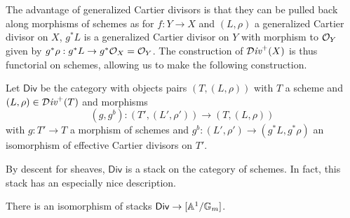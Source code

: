 \\\\
The advantage of generalized Cartier divisors is that they can be pulled back along morphisms of schemes as for $f:Y\to X$ and $(L,\rho)$ a generalized Cartier divisor on $X$, $g^{*}L$ is a generalized Cartier divisor on $Y$ with morphism to $\mathcal{O}_{Y}$ given by $g^{*}\rho:g^{*}L\to g^{*}\mathcal{O}_{X}=\mathcal{O}_{Y}$. The construction of $\operatorname{\mathcal{D}\emph{iv}}^{+}(X)$ is thus functorial on schemes, allowing us to make the following construction. 
\begin{definition}\label{def: the fibered category of generalized cartier Divisors}
    Let $\mathsf{Div}$ be the category with objects pairs $\left(T,(L,\rho)\right)$ with $T$ a scheme and $(L,\rho)\in\operatorname{\mathcal{D}\emph{iv}}^{+}(T)$ and morphisms 
    $$(g,g^{b}):\left(T',(L',\rho')\right)\longrightarrow\left(T,(L,\rho)\right)$$
    with $g:T'\to T$ a morphism of schemes and $g^{b}:(L',\rho')\to(g^{*}L,g^{*}\rho)$ an isomorphism of effective Cartier divisors on $T'$. 
\end{definition}
By descent for sheaves, $\mathsf{Div}$ is a stack on the category of schemes. In fact, this stack has an especially nice description. 
\begin{proposition}\label{prop: Div fibered category is isomorphic to the line mod Gm}
    There is an isomorphism of stacks $\mathsf{Div}\to[\mathbb{A}^{1}/\mathbb{G}_{m}]$. 
\end{proposition}
